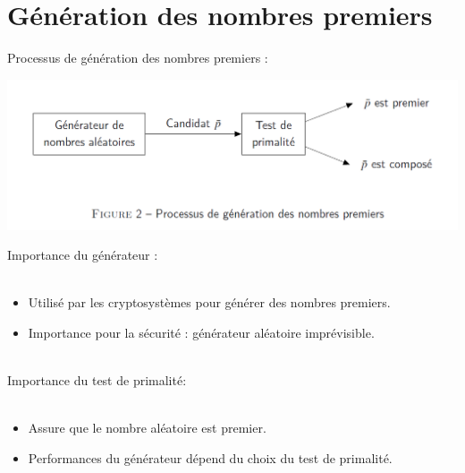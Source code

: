 	\section{Génération des nombres premiers}
		
		\begin{frame}
			Processus de génération des nombres premiers :\\
			\begin{center}\includegraphics[scale=0.5]{img/gen.png}\end{center}
		\end{frame}
		
		\begin{frame}
			Importance du générateur :\\~\\
			\begin{itemize}
				\item Utilisé par les cryptosystèmes pour générer des nombres premiers.
				\item Importance pour la sécurité : générateur aléatoire imprévisible. 
			\end{itemize}
			~\\
			\pause
			Importance du test de primalité:\\~\\
			\begin{itemize}
				\item Assure que le nombre aléatoire est premier.
				\item Performances du générateur dépend du choix du test de primalité.
			\end{itemize}
		\end{frame}
		
